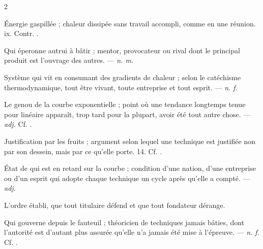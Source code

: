 \begin{multicols}{2}

 Énergie gaspillée ; chaleur dissipée sans travail accompli, comme en une réunion.   ix. Contr. .

 Qui éperonne autrui à bâtir ; mentor, provocateur ou rival dont le principal produit est l'ouvrage des autres.  —  \textit{n. m.}

 Système qui vit en consumant des gradients de chaleur ; selon le catéchisme thermodynamique, tout être vivant, toute entreprise et tout esprit.   —  \textit{n. f.}

 Le genou de la courbe exponentielle ; point où une tendance longtemps tenue pour linéaire apparaît, trop tard pour la plupart, avoir été tout autre chose.   —  \textit{adj.} Cf. .

 Justification par les fruits ; argument selon lequel une technique est justifiée non par son dessein, mais par ce qu'elle porte.   14. Cf. .

 État de qui est en retard sur la courbe ; condition d'une nation, d'une entreprise ou d'un esprit qui adopte chaque technique un cycle après qu'elle a compté. —  \textit{adj.}

  L'ordre établi, que tout titulaire défend et que tout fondateur dérange.

 Qui gouverne depuis le fauteuil ; théoricien de techniques jamais bâties, dont l'autorité est d'autant plus assurée qu'elle n'a jamais été mise à l'épreuve. —  \textit{n. f.} Cf. .


\end{multicols}
